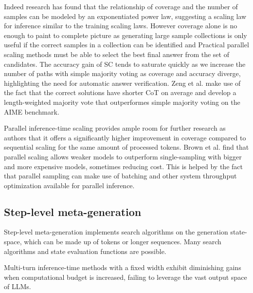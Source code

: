 Indeed research\cite{brown2024largelanguagemonkeysscaling} has found that the relationship of coverage and the 
number of samples can be modeled by an exponentiated power law, suggesting a scaling law for inference
similar to the training scaling laws.
However coverage alone is no enough to paint to complete picture as generating large sample 
collections is only useful if the correct samples in a collection can be identified\cite{brown2024largelanguagemonkeysscaling} and Practical
parallel scaling methods must be able to select the best final answer from the set of candidates\cite{zeng2025revisitingtesttimescalingo1like}.
The accuracy gain of SC tends to saturate quickly as we increase the number of paths\cite{wang2023selfconsistencyimproveschainthought}
with simple majority voting as coverage and accuracy diverge\cite{brown2024largelanguagemonkeysscaling}, highlighting the need
for automatic answer verification. Zeng et al.\cite{zeng2025revisitingtesttimescalingo1like} make use of the fact that
the correct solutions have shorter CoT on average and develop a length-weighted majority vote that outperformes simple majority voting on 
the AIME benchmark.

Parallel inference-time scaling provides ample room for further research as authors\cite{zeng2025revisitingtesttimescalingo1like}
that it offers a significantly higher improvement in coverage compared to sequential scaling for the same amount of processed tokens. 
Brown et al.\cite{brown2024largelanguagemonkeysscaling} find that parallel scaling allows weaker models to 
outperform single-sampling with bigger and more expensive models, sometimes reducing cost.
This is helped by the fact that parallel sampling can make use of batching and other system throughput optimization
available for parallel inference\cite{brown2024largelanguagemonkeysscaling}.

\subsection{Step-level meta-generation}
Step-level meta-generation implements search algorithms on the generation state-space, which can be made up of tokens or longer sequences. Many search algorithms and state evaluation functions are possible. \cite{welleck2024decodingmetagenerationinferencetimealgorithms}


Multi-turn inference-time methods with a fixed width exhibit diminishing gains when computational budget is increased, failing to leverage the vast output space of LLMs.\cite{misaki2025widerdeeperscalingllm} 

